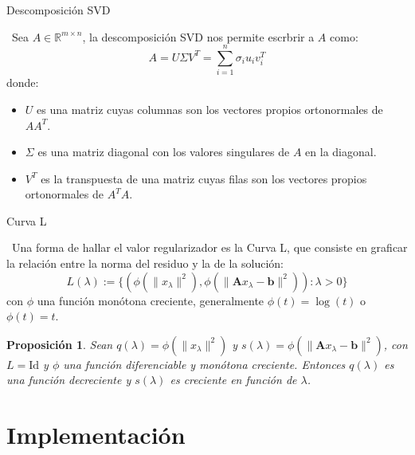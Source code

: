 \documentclass[12pt]{beamer}
\newtheorem{proposition}{Proposición}
\begin{document}
	\begin{frame}{Descomposición SVD}
		
		\ Sea $A \in \mathbb{R}^{m \times n}$, la descomposición SVD nos permite escrbrir a $A$ como: $$A = U \Sigma V^T = \sum_{i=1}^{n} \sigma_i u_i v_i^T$$
		donde:
		
		\begin{itemize}
			\item \( U \) es una matriz cuyas columnas son los vectores propios ortonormales de \( A A^T \).
			\item \( \Sigma \) es una matriz diagonal con los valores singulares de \( A \) en la diagonal.
			\item \( V^T \) es la transpuesta de una matriz cuyas filas son los vectores propios ortonormales de \( A^T A \).
		\end{itemize}
		
	\end{frame}
	
	\begin{frame}{Curva L}
		
		\ Una forma de hallar el valor regularizador es la Curva L, que consiste en graficar la relación entre la norma del residuo y la de la solución: $$L(\lambda) := \{(\phi (\| x_\lambda  \|^2), \phi (\| \mathbf{A}x_\lambda - \mathbf{b} \|^2) ): \lambda > 0\}$$ con $\phi$ una función monótona creciente, generalmente $\phi(t) = \log(t)$ o $\phi(t) = t$.
		
		\begin{proposition}
			Sean $q(\lambda) = \phi (\| x_\lambda  \|^2)$ y $s(\lambda) = \phi (\| \mathbf{A}x_\lambda - \mathbf{b} \|^2 )$, con $L = \mathrm{Id}$ y $\phi$ una función diferenciable y monótona creciente. Entonces $q(\lambda)$ es una función decreciente y $s(\lambda)$ es creciente en función de $\lambda$.
		\end{proposition}
		
	\end{frame}
	
	
	\section{Implementación}
	
	
	
	
\end{document}
